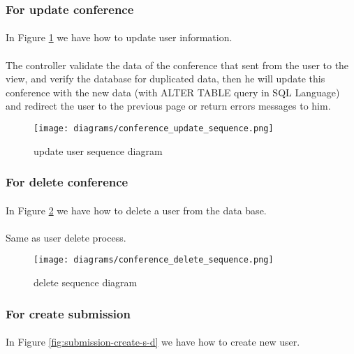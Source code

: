 	\subsubsection{For update conference}
	\paragraph{}
	In Figure \ref{fig:conference-update-s-d} we have how to update user information.
	\paragraph{}
	The controller validate the data of the conference that sent from the user to the view, and verify the database for duplicated data, then he will update this conference with the new data (with ALTER TABLE query in SQL Language) and redirect the user to the previous page or return errors messages to him.
	
		\begin{figure}[!ht]
			\centering
			\texttt{[image: diagrams/conference\_update\_sequence.png]}
			\caption{update user sequence diagram}
			\label{fig:conference-update-s-d}
		\end{figure}
	
	\subsubsection{For delete conference}
	\paragraph{}
	In Figure \ref{fig:conference-delete-s-d} we have how to delete a user from the data base.
	\paragraph{}
	Same as user delete process.
	
		\begin{figure}[!ht]
			\centering
			\texttt{[image: diagrams/conference\_delete\_sequence.png]}
			\caption{delete sequence diagram}
			\label{fig:conference-delete-s-d}
		\end{figure}
	
	\subsubsection{For create submission}
	\paragraph{}
	In Figure \ref{fig:submission-create-s-d} we have how to create new user.
	
